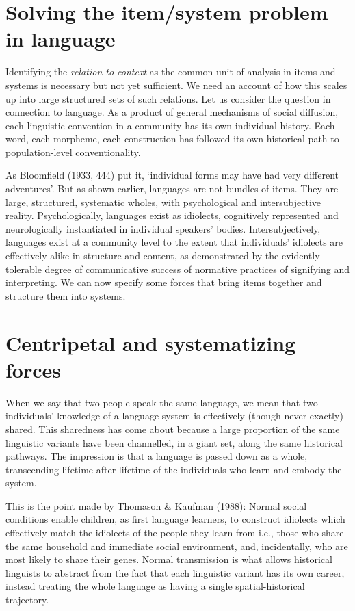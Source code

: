 \section{Solving the item/system problem in language}


Identifying the \textit{relation to context} as the common unit of 
analysis in items and systems is necessary but not yet sufficient. We 
need an account of how this scales up into large structured sets of such 
relations. Let us consider the question in connection to language. As a 
product of general mechanisms of social diffusion, each linguistic 
convention in a community has its own individual history. Each word, 
each morpheme, each construction has followed its own historical path to 
population-level conventionality. 



As Bloomfield (1933, 444) put it, \textquoteleft individual forms may have had very 
different adventures'. But as shown earlier, languages are not bundles 
of items. They are large, structured, systematic wholes, with 
psychological and intersubjective reality. Psychologically, languages 
exist as idiolects, cognitively represented and neurologically 
instantiated in individual speakers' bodies. Intersubjectively, 
languages exist at a community level to the extent that individuals' 
idiolects are effectively alike in structure and content, as 
demonstrated by the evidently tolerable degree of communicative success 
of normative practices of signifying and interpreting. We can now 
specify some forces that bring items together and structure them into 
systems.



\section{Centripetal and systematizing forces}


When we say that two people speak the same language, we mean that two 
individuals' knowledge of a language system is effectively (though never 
exactly) shared. This sharedness has come about because a large 
proportion of the same linguistic variants have been channelled, in a 
giant set, along the same historical pathways. The impression is that a 
language is passed down as a whole, transcending lifetime after lifetime 
of the individuals who learn and embody the system. 



This is the point made by Thomason \& Kaufman (1988): Normal social 
conditions enable children, as first language learners, to construct 
idiolects which effectively match the idiolects of the people they learn 
from-i.e., those who share the same household and immediate social 
environment, and, incidentally, who are most likely to share their 
genes. Normal transmission is what allows historical linguists to 
abstract from the fact that each linguistic variant has its own career, 
instead treating the whole language as having a single 
spatial-historical trajectory. 



